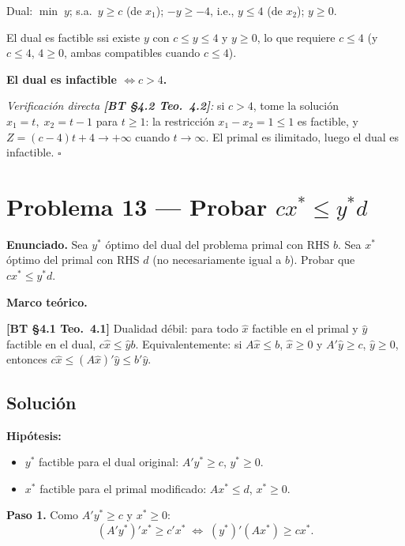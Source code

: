 \documentclass{article}
\newenvironment{marco}{\begin{mdframed}[linecolor=black!40,backgroundcolor=gray!5]\small\textbf{Marco teórico.}\par\smallskip}{\end{mdframed}\medskip}
\begin{document}
Dual: $\min\; y$; s.a.\ $y \geq c$ (de $x_1$); $-y \geq -4$, i.e., $y \leq 4$ (de $x_2$); $y \geq 0$.

El dual es factible ssi existe $y$ con $c \leq y \leq 4$ y $y \geq 0$, lo que requiere $c \leq 4$ (y $c \leq 4$, $4 \geq 0$, ambas compatibles cuando $c \leq 4$).

\textbf{El dual es infactible $\Leftrightarrow c > 4$.}

\textit{Verificación directa \textbf{[BT §4.2 Teo.\ 4.2]}:} si $c > 4$, tome la solución $x_1 = t,\; x_2 = t-1$ para $t \geq 1$: la restricción $x_1 - x_2 = 1 \leq 1$ es factible, y $Z = (c-4)t + 4 \to +\infty$ cuando $t \to \infty$. El primal es ilimitado, luego el dual es infactible. $\square$

\section*{Problema 13 --- Probar $cx^* \leq y^*d$}

\textbf{Enunciado.} Sea $y^*$ óptimo del dual del problema primal con RHS $b$. Sea $x^*$ óptimo del primal con RHS $d$ (no necesariamente igual a $b$). Probar que $cx^* \leq y^*d$.

\begin{marco}
\textbf{[BT §4.1 Teo.\ 4.1]} Dualidad débil: para todo $\hat{x}$ factible en el primal y $\hat{y}$ factible en el dual, $c\hat{x} \leq \hat{y}b$. Equivalentemente: si $A\hat{x} \leq b$, $\hat{x} \geq 0$ y $A'\hat{y} \geq c$, $\hat{y} \geq 0$, entonces $c\hat{x} \leq (A\hat{x})'\hat{y} \leq b'\hat{y}$.
\end{marco}

\subsection*{Solución}

\textbf{Hipótesis:}
\begin{itemize}
  \item $y^*$ factible para el dual original: $A'y^* \geq c$, $y^* \geq 0$.
  \item $x^*$ factible para el primal modificado: $Ax^* \leq d$, $x^* \geq 0$.
\end{itemize}

\textbf{Paso 1.} Como $A'y^* \geq c$ y $x^* \geq 0$:
\[
  (A'y^*)'x^* \geq c'x^* \;\Leftrightarrow\; (y^*)'(Ax^*) \geq cx^*.
\]
\end{document}
